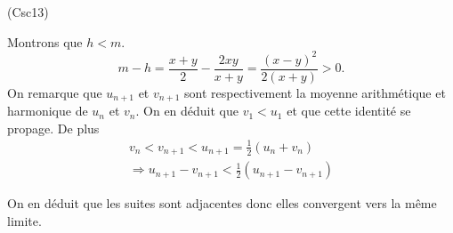 \begin{tiny}(Csc13)\end{tiny} Montrons que $h < m$.
\[
 m - h 
 = \frac{x + y}{2} - \frac{2xy}{x + y}
 = \frac{(x-y)^2}{2(x+y)} > 0.
\]
On remarque que $u_{n+1}$ et $v_{n+1}$ sont respectivement la moyenne arithmétique et harmonique de $u_n$ et $v_n$. 
On en déduit que $v_1 < u_1$ et que cette identité se propage. De plus 
\begin{multline*}
v_n < v_{n+1} < u_{n+1} = \frac{1}{2}(u_n + v_n) \\
\Rightarrow  u_{n+1} - v_{n+1} < \frac{1}{2}\left( u_{n+1} - v_{n+1}\right) 
\end{multline*}

On en déduit que les suites sont adjacentes donc elles convergent vers la même limite.
